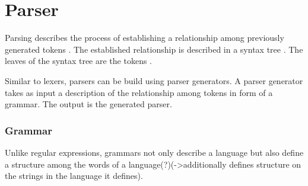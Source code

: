 





\section{Parser}\label{sec:BackgroundParser}

Parsing describes the process of establishing a relationship among previously generated tokens \cite{LexYacc.1992}.
The established relationship is described in a syntax tree \cite{Mogensen.2017}. The leaves of the syntax tree are the tokens \cite{Mogensen.2017}.

Similar to lexers, parsers can be build using parser generators.
A parser generator takes as input a description of the relationship among tokens in form of a grammar. The output is the generated parser. \cite{LexYacc.1992}

\subsubsection{Grammar}

Unlike regular expressions, grammars not only describe a language but also define a structure among the words of a language(?)(->additionally defines structure on the strings in the language it defines).

